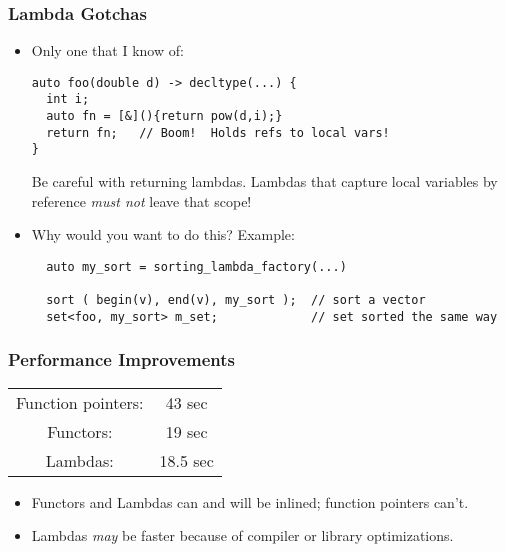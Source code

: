 \begin{frame}[fragile,t]
\frametitle{Lambda Gotchas}
\begin{itemize}
\item Only one that I know of:
{\scriptsize
\begin{verbatim}
auto foo(double d) -> decltype(...) {
  int i;
  auto fn = [&](){return pow(d,i);}
  return fn;   // Boom!  Holds refs to local vars!
}
\end{verbatim}}

Be careful with returning lambdas.  Lambdas that capture local
variables by reference \emph{must not} leave that scope!

\vskip 18pt


\item Why would you want to do this?  Example:
{\scriptsize
\begin{verbatim}
  auto my_sort = sorting_lambda_factory(...)

  sort ( begin(v), end(v), my_sort );  // sort a vector
  set<foo, my_sort> m_set;             // set sorted the same way
\end{verbatim}
}

\end{itemize}
\end{frame}


\begin{frame}[fragile,t]
\frametitle{Performance Improvements}

\pause

\begin{tabular}{cc}
Function pointers: &  43 sec  \\
Functors:         &  19 sec   \\
Lambdas:          &  18.5 sec \\
\end{tabular}

\begin{itemize}
\item Functors and Lambdas can and will be inlined; function pointers
  can't.
\item Lambdas \emph{may} be faster because of compiler or library optimizations.
\end{itemize}
\end{frame}

